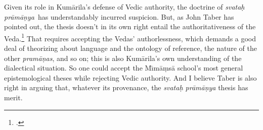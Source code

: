 \documentclass[11pt,letterpaper,oneside]{amsart}
\newcommand{\e}{\emph}
\newcommand{\kum}{Kum\={a}rila}
\newcommand{\svapra}{\e{svata\d{h} pr\={a}m\={a}\d{n}ya}}
\begin{document}
Given its role in \kum's defense of Vedic authority, the doctrine of \svapra\ has understandably incurred suspicion. But, as John Taber has pointed out, the thesis doesn't in its own right entail the authoritativeness of the Veda.\footnote{\citet[p.\ X]{taber1992dkb}.} That requires accepting the Vedas' authorlessness, which demands a good deal of theorizing about language and the ontology of reference, the nature of the other \emph{pram\=a\d nas}, and so on; this is also Kum\=arila's own understanding of the dialectical situation. So one could accept the M\={\i}m\=a\d ms\=a school's most general epistemological theses while rejecting Vedic authority. And I believe Taber is also right in arguing that, whatever its provenance, the \emph{svata\d h pr\=am\=a\d nya} thesis has merit.

\end{document}
